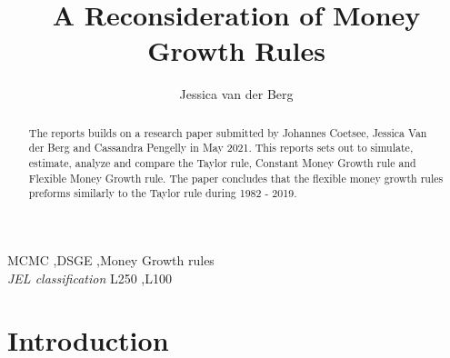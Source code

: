 \documentclass[11pt,preprint, authoryear]{elsarticle}
\numberwithin{equation}{section}
\numberwithin{figure}{section}
\numberwithin{table}{section}
\begin{document}
\begin{frontmatter}  %

\title{A Reconsideration of Money Growth Rules}





\author[Add1]{Jessica van der Berg}





\address[Add1]{Stellenbosch Univeristy, South Africa}


\begin{abstract}
\small{
The reports builds on a research paper submitted by Johannes Coetsee,
Jessica Van der Berg and Cassandra Pengelly in May 2021. This reports
sets out to simulate, estimate, analyze and compare the Taylor rule,
Constant Money Growth rule and Flexible Money Growth rule. The paper
concludes that the flexible money growth rules preforms similarly to the
Taylor rule during 1982 - 2019.
}
\end{abstract}

\vspace{1cm}


\begin{keyword}
\footnotesize{
MCMC \sep DSGE \sep Money Growth rules \\
\vspace{0.3cm}
}
\footnotesize{
\textit{JEL classification} L250 \sep L100
}
\end{keyword}



\vspace{0.5cm}

\end{frontmatter}



\pagestyle{fancy}
\chead{}
\lfoot{}
\lhead{}
\cfoot{}


\headsep 35pt %




\hypertarget{introduction}{%
\section{\texorpdfstring{Introduction
\label{Introduction}}{Introduction }}\label{introduction}}
\end{document}
